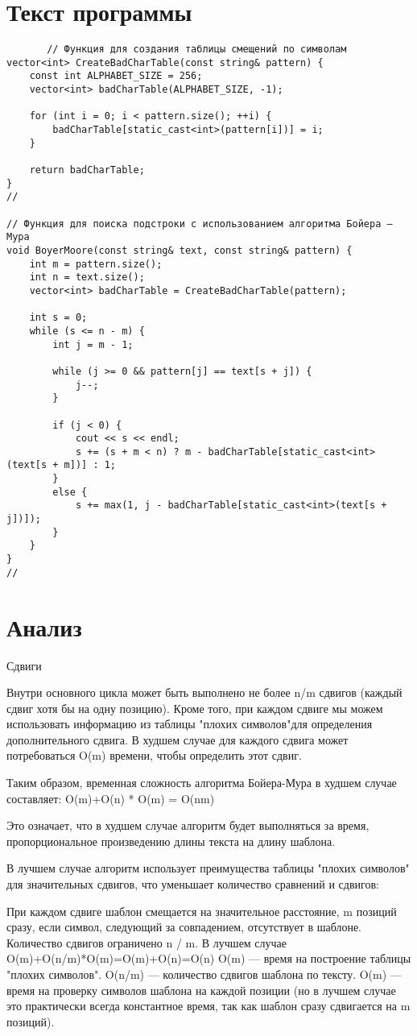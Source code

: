 \documentclass[bachelor, och, referat, times]{SCWorks}
\begin{document}
    \section{Текст программы}
       \begin{verbatim}
       // Функция для создания таблицы смещений по символам
vector<int> CreateBadCharTable(const string& pattern) {
    const int ALPHABET_SIZE = 256;
    vector<int> badCharTable(ALPHABET_SIZE, -1);

    for (int i = 0; i < pattern.size(); ++i) {
        badCharTable[static_cast<int>(pattern[i])] = i;
    }

    return badCharTable;
}
//

// Функция для поиска подстроки с использованием алгоритма Бойера — Мура
void BoyerMoore(const string& text, const string& pattern) {
    int m = pattern.size();
    int n = text.size();
    vector<int> badCharTable = CreateBadCharTable(pattern);

    int s = 0;
    while (s <= n - m) {
        int j = m - 1;

        while (j >= 0 && pattern[j] == text[s + j]) {
            j--;
        }

        if (j < 0) {
            cout << s << endl;
            s += (s + m < n) ? m - badCharTable[static_cast<int>(text[s + m])] : 1;
        }
        else {
            s += max(1, j - badCharTable[static_cast<int>(text[s + j])]);
        }
    }
}
//

 \end{verbatim}
  
\section{Анализ}


Сдвиги

Внутри основного цикла может быть выполнено не более n/m сдвигов 
(каждый сдвиг хотя бы на одну позицию).
Кроме того, при каждом сдвиге мы можем использовать информацию из таблицы 
"плохих символов"для определения дополнительного сдвига. 
 В худшем случае для каждого сдвига может потребоваться O(m) времени, 
 чтобы определить этот сдвиг.

Таким образом, временная сложность алгоритма Бойера-Мура в худшем случае составляет:
O(m)+O(n) * O(m) = O(nm)

Это означает, что в худшем случае алгоритм будет выполняться за время, 
пропорциональное произведению длины текста на длину шаблона.

В лучшем случае алгоритм использует преимущества таблицы "плохих символов" 
для значительных сдвигов, что уменьшает количество сравнений и сдвигов: 

При каждом сдвиге шаблон смещается на значительное расстояние,
 m позиций сразу, если символ, следующий за совпадением, отсутствует в шаблоне.
  Количество сдвигов ограничено n / m. В лучшем случае O(m)+O(n/m)*O(m)=O(m)+O(n)=O(n)
O(m) — время на построение таблицы "плохих символов". O(n/m) — количество сдвигов шаблона 
по тексту.
 O(m) — время на проверку символов шаблона на каждой позиции 
 (но в лучшем случае это практически всегда константное время, 
 так как шаблон сразу сдвигается на m позиций).

    \appendix
     
\end{document}
